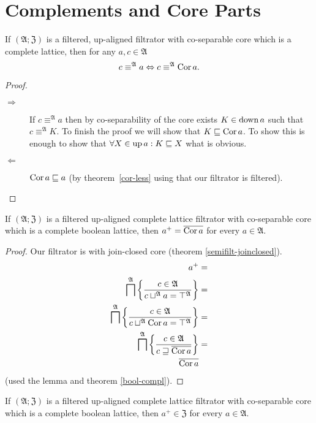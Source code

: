 \section{Complements and Core Parts}
\begin{lem}
If $(\mathfrak{A};\mathfrak{Z})$ is a filtered, up-aligned filtrator
with co-separable core which is a complete lattice, then for any $a,c\in\mathfrak{A}$
\[
c\equiv^{\mathfrak{A}}a\Leftrightarrow c\equiv^{\mathfrak{A}}\operatorname{Cor} a.
\]
\end{lem}
\begin{proof}
~
\begin{description}
\item [{$\Rightarrow$}] If $c\equiv^{\mathfrak{A}}a$ then by co-separability
of the core exists $K\in\operatorname{down} a$ such that $c\equiv^{\mathfrak{A}}K$.
To finish the proof we will show that $K\sqsubseteq\operatorname{Cor} a$. To show
this is enough to show that $\forall X\in\operatorname{up} a:K\sqsubseteq X$ what
is obvious.
\item [{$\Leftarrow$}] $\operatorname{Cor} a\sqsubseteq a$ (by theorem~\ref{cor-less}
using that our filtrator is filtered).
\end{description}
\end{proof}
\begin{thm}
\label{cocompl-cor}If $(\mathfrak{A};\mathfrak{Z})$ is a filtered
up-aligned complete lattice filtrator with co-separable core which
is a complete boolean lattice, then $a^{+}=\overline{\operatorname{Cor} a}$ for
every $a\in\mathfrak{A}$.\end{thm}
\begin{proof}
Our filtrator is with join-closed core (theorem \ref{semifilt-joinclosed}).
\begin{align*}
a^{+} & =\\
\bigsqcap^{\mathfrak{A}}\left\{ \frac{c\in\mathfrak{A}}{c\sqcup^{\mathfrak{A}}a=\top^{\mathfrak{A}}}\right\} & =\\
\bigsqcap^{\mathfrak{A}}\left\{ \frac{c\in\mathfrak{A}}{c\sqcup^{\mathfrak{A}}\operatorname{Cor} a=\top^{\mathfrak{A}}}\right\} & =\\
\bigsqcap^{\mathfrak{A}}\left\{ \frac{c\in\mathfrak{A}}{c\sqsupseteq\overline{\operatorname{Cor} a}}\right\} & =\\
\overline{\operatorname{Cor} a}
\end{align*}
(used the lemma and theorem \ref{bool-compl}).\end{proof}
\begin{cor}
If $(\mathfrak{A};\mathfrak{Z})$ is a filtered up-aligned complete
lattice filtrator with co-separable core which is a complete boolean
lattice, then $a^{+}\in\mathfrak{Z}$ for every $a\in\mathfrak{A}$.\end{cor}
